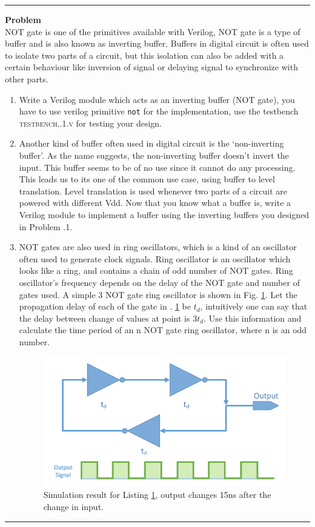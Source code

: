 \documentclass[a4paper,10pt]{article}
\newcommand{\ano}{\text{2}}
\theoremstyle{mytheor}
\newcounter{problemNumber}
\newcommand {
  \insertProblem}[1]{
  \vspace{0.5cm}
  \hrule
  \vspace{0.3cm}

  {\color{greatblue}\textbf{\large{Problem \theproblemNumber}}}
  \vspace{2pt}\\#1

  \addtocounter{problemNumber}{1}
  \vspace{0.2cm}
  \hrule  
  \vspace{0.5cm}
}
\begin{document}
\insertProblem { NOT gate is one of the primitives available with
  Verilog, NOT gate is a type of buffer and is also known as inverting
  buffer. Buffers in digital circuit is often used to isolate two
  parts of a circuit, but this isolation can also be added with a
  certain behaviour like inversion of signal or delaying signal to
  synchronize with other parts.
  
  \begin {enumerate}
  \item Write a Verilog module which acts as an inverting buffer (NOT
    gate), you have to use verilog primitive
    \lstinline[style=verilog_inline_style]{not} for the
    implementation, use the testbench
    \textsc{testbench{\ano}.{\theproblemNumber}.1.v} for testing your
    design.
  \item Another kind of buffer often used in digital circuit is the
    `non-inverting buffer'. As the name suggests, the non-inverting
    buffer doesn't invert the input. This buffer seems to be of no use
    since it cannot do any processing. This leads us to its one of the
    common use case, using buffer to level translation. Level
    translation is used whenever two parts of a circuit are powered
    with different Vdd. Now that you know what a buffer is, write a
    Verilog module to implement a buffer using the inverting buffers
    you designed in Problem {\theproblemNumber}.1.
  \item NOT gates are also used in ring oscillators, which is a kind
    of an oscillator often used to generate clock signals. Ring
    oscillator is an oscillator which looks like a ring, and contains
    a chain of odd number of NOT gates. Ring oscillator's frequency
    depends on the delay of the NOT gate and number of gates used. A
    simple 3 NOT gate ring oscillator is shown in
    Fig. \ref{ring-oscillator}. Let the propagation delay of each of
    the gate in \Fig. \ref{ring-oscillator} be $t_d$, intuitively one
    can say that the delay between change of values at point is
    $3t_d$. Use this information and calculate the time period of an n
    NOT gate ring oscillator, where n is an odd number.

    \begin{figure}[!h] \centering  
      \includegraphics[width=0.5\linewidth]{./resources/ringOscillator.pdf}
      \caption{Simulation result for Listing \ref{ring-oscillator}, output changes 15ns after the change in input.} 
      \label{ring-oscillator}
    \end{figure}


\end{enumerate}}
\end{document}
